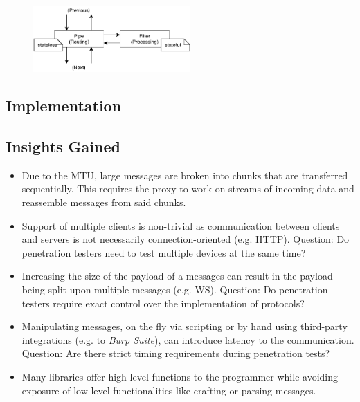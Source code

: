 
% 
\begin{figure}
    \centering
    \includegraphics[width=6cm]{img/ch04/Architecture - Pipes and Filters.pdf}
    \label{fig:design-pipes-and-filters}
\end{figure}





\subsection{Implementation}

\subsection{Insights Gained}
\begin{itemize}
    \item Due to the \ac{MTU}, large messages are broken into chunks that are transferred sequentially. This requires the proxy to work on streams of incoming data and reassemble messages from said chunks.
    \item Support of multiple clients is non-trivial as communication between clients and servers is not necessarily connection-oriented (e.g. \ac{HTTP}). Question: Do penetration testers need to test multiple devices at the same time?
    \item Increasing the size of the payload of a messages can result in the payload being split upon multiple messages (e.g. \ac{WS}). Question: Do penetration testers require exact control over the implementation of protocols?
    \item Manipulating messages, on the fly via scripting or by hand using third-party integrations (e.g. to \emph{Burp Suite}), can introduce latency to the communication. Question: Are there strict timing requirements during penetration tests?
    \item Many libraries offer high-level functions to the programmer while avoiding exposure of low-level functionalities like crafting or parsing messages.
\end{itemize}

